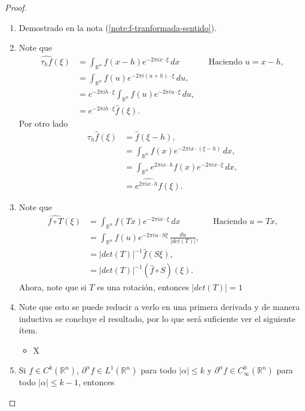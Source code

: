   \begin{proof} 
    \begin{enumerate}
      \item Demostrado en la nota (\ref{note:f-tranformada-sentido}).
      \item Note que
        \begin{align*}
          \hat{\tau_{h}f}(\xi)&=\int_{\mathbb{R}^{n}}f(x-h)e^{-2\pi ix\cdot\xi}\,dx &&\text{Haciendo $u=x-h$},\\
          &=\int_{\mathbb{R}^{n}}f(u)e^{-2\pi i (u+h)\cdot\xi}\,du,\\
          &=e^{-2\pi ih\cdot\xi}\int_{\mathbb{R}^{n}}f(u)e^{-2\pi i u\cdot\xi}\,du,\\
          &=e^{-2\pi ih\cdot\xi} \hat{f}(\xi).
        \end{align*}
        Por otro lado
        \begin{align*}
          \tau_{h}\hat{f}(\xi)&=\hat{f}(\xi-h),\\
          &=\int_{\mathbb{R}^{n}}f(x)e^{-2\pi ix\cdot (\xi-h)}\,dx,\\
          &=\int_{\mathbb{R}^{n}}e^{2\pi ix\cdot h}f(x)e^{-2\pi ix\cdot \xi}\,dx,\\
          &=\hat{e^{2\pi ix\cdot h}f}(\xi).
        \end{align*}
      \item Note que
        \begin{align*}
          \hat{f\circ T}(\xi)&=\int_{\mathbb{R}^{n}}f(Tx)e^{-2\pi ix\cdot\xi}\,dx &&\text{Haciendo $u=Tx$,}\\
          &=\int_{\mathbb{R}^{n}}f(u)e^{-2\pi i u\cdot S\xi}\,\frac{du}{|det(T)|},\\
          &=|det(T)|^{-1}\hat{f}(S\xi),\\
          &=|det(T)|^{-1}(\hat{f}\circ S)(\xi).
        \end{align*}
        Ahora, note que si $T$ es una rotación, entonces $|det(T)|=1$ 
      \item Note que esto se puede reducir a verlo en una primera derivada y de manera inductiva se concluye el resultado, por lo que será suficiente ver el siguiente ítem.
      \begin{itemize}
        \item X
      \end{itemize}
      \item Si $f\in C^{k}(\mathbb{R}^{n})$, $\partial^{\alpha}f\in L^{1}(\mathbb{R}^{n})$ para todo $|\alpha|\leq k$ y $\partial^{\alpha}f\in C^{0}_{\infty}(\mathbb{R}^{n})$ para todo $|\alpha|\leq k-1$, entonces

\end{enumerate}
\end{proof}
